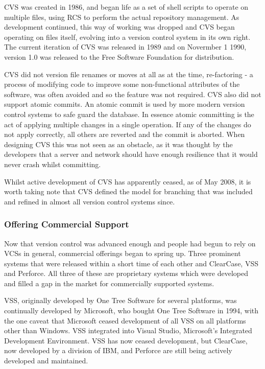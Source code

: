 CVS was created in 1986, and began life as a set of shell scripts to operate on multiple files, using RCS to perform the actual repository management.
As development continued, this way of working was dropped and CVS began operating on files itself, evolving into a version control system in its own right.
The current iteration of CVS was released in 1989 and on Novermber 1 1990, version 1.0 was released to the Free Software Foundation for distribution.

CVS did not version file renames or moves at all as at the time, re-factoring - a process of modifying code to improve some non-functional attributes of the software, was often avoided and so the feature was not required.
CVS also did not support atomic commits.
An atomic commit is used by more modern version control systems to safe guard the database.
In essence atomic committing is the act of applying multiple changes in a single operation.
If any of the changes do not apply correctly, all others are reverted and the commit is aborted.
When designing CVS this was not seen as an obstacle, as it was thought by the developers that a server and network should have enough resilience that it would never crash whilst committing.

Whilst active development of CVS has apparently ceased, as of May 2008, it is worth taking note that CVS defined the model for branching that was included and refined in almost all version control systems since.

\subsubsection{Offering Commercial Support}
Now that version control was advanced enough and people had begun to rely on VCSs in general, commercial offerings began to spring up.
Three prominent systems that were released within a short time of each other and ClearCase, VSS and Perforce.
All three of these are proprietary systems which were developed and filled a gap in the market for commercially supported systems.

VSS, originally developed by One Tree Software for several platforms, was continually developed by Microsoft, who bought One Tree Software in 1994, with the one caveat that Microsoft ceased development of all VSS on all platforms other than Windows.
VSS integrated into Visual Studio, Microsoft's Integrated Development Environment.
VSS has now ceased development, but ClearCase, now developed by a division of IBM, and Perforce are still being actively developed and maintained.

